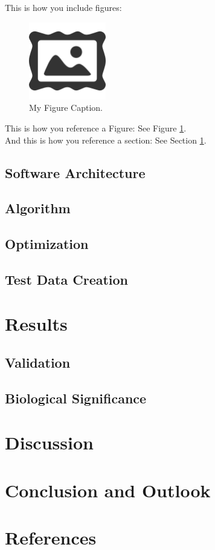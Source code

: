 \documentclass{article}
\begin{document}
This is how you include figures:
\begin{figure}[htb]
\begin{center}
\includegraphics[width = 0.3\textwidth]{icon.png}
\end{center}
\caption{My Figure Caption.}
\label{fig: example} %
\end{figure}

This is how you reference a Figure: See Figure \ref{fig: example}. \\
And this is how you reference a section: See Section \ref{sec: Results}.
\subsection{Software Architecture}
\subsection{Algorithm}
\subsection{Optimization}
\subsection{Test Data Creation}
\section{Results}\label{sec: Results}
\subsection{Validation}
\subsection{Biological Significance}
\section{Discussion}
\section{Conclusion and Outlook}

\section{References}
%


\end{document}
